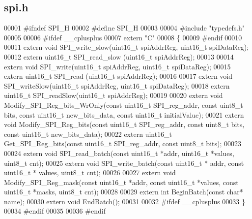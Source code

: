 \subsection{spi.\+h}
\label{spi_8h_source}

\begin{DoxyCode}
00001 \textcolor{preprocessor}{#ifndef SPI\_H}
00002 \textcolor{preprocessor}{#define SPI\_H}
00003 
00004 \textcolor{preprocessor}{#include "typedefs.h"}
00005 
00006 \textcolor{preprocessor}{#ifdef \_\_cplusplus}
00007 \textcolor{keyword}{extern} \textcolor{stringliteral}{"C"}
00008 \{
00009 \textcolor{preprocessor}{#endif}
00010 
00011 \textcolor{keyword}{extern} \textcolor{keywordtype}{void} SPI_write_slow(uint16\_t spiAddrReg, uint16\_t spiDataReg);
00012 \textcolor{keyword}{extern} uint16\_t SPI_read_slow (uint16\_t spiAddrReg);
00013 
00014 \textcolor{keyword}{extern} \textcolor{keywordtype}{void} SPI_write(uint16\_t spiAddrReg, uint16\_t spiDataReg);
00015 \textcolor{keyword}{extern} uint16\_t SPI_read (uint16\_t spiAddrReg);
00016 
00017 \textcolor{keyword}{extern} \textcolor{keywordtype}{void} SPI_writeSlow(uint16\_t spiAddrReg, uint16\_t spiDataReg);
00018 \textcolor{keyword}{extern} uint16\_t SPI_readSlow(uint16\_t spiAddrReg);
00019 
00020 \textcolor{keyword}{extern} \textcolor{keywordtype}{void} Modify_SPI_Reg_bits_WrOnly(\textcolor{keyword}{const} uint16\_t SPI\_reg\_addr, \textcolor{keyword}{const} uint8\_t bits, \textcolor{keyword}{const} uint16\_t 
      new\_bits\_data, \textcolor{keyword}{const} uint16\_t initialValue);
00021 \textcolor{keyword}{extern} \textcolor{keywordtype}{void} Modify_SPI_Reg_bits(\textcolor{keyword}{const} uint16\_t SPI\_reg\_addr, \textcolor{keyword}{const} uint8\_t bits, \textcolor{keyword}{const} uint16\_t 
      new\_bits\_data);
00022 \textcolor{keyword}{extern} uint16\_t Get_SPI_Reg_bits(\textcolor{keyword}{const} uint16\_t SPI\_reg\_addr, \textcolor{keyword}{const} uint8\_t bits);
00023 
00024 \textcolor{keyword}{extern} \textcolor{keywordtype}{void} SPI_read_batch(\textcolor{keyword}{const} uint16\_t *addr, uint16\_t *values, uint8\_t cnt);
00025 \textcolor{keyword}{extern} \textcolor{keywordtype}{void} SPI_write_batch(\textcolor{keyword}{const} uint16\_t * addr, \textcolor{keyword}{const} uint16\_t * values, uint8\_t cnt);
00026 
00027 \textcolor{keyword}{extern} \textcolor{keywordtype}{void} Modify_SPI_Reg_mask(\textcolor{keyword}{const} uint16\_t *addr, \textcolor{keyword}{const} uint16\_t *values, \textcolor{keyword}{const} uint16\_t *masks, 
      uint8\_t cnt);
00028 
00029 \textcolor{keyword}{extern} \textcolor{keywordtype}{int} BeginBatch(\textcolor{keyword}{const} \textcolor{keywordtype}{char}* name);
00030 \textcolor{keyword}{extern} \textcolor{keywordtype}{void} EndBatch();
00031 
00032 \textcolor{preprocessor}{#ifdef \_\_cplusplus}
00033 \}
00034 \textcolor{preprocessor}{#endif}
00035 
00036 \textcolor{preprocessor}{#endif}
\end{DoxyCode}
